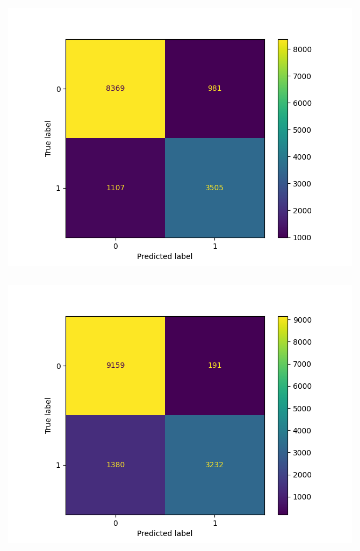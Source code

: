 \begin{figure}
        \vspace{-0.6cm}
        \hspace{-2cm}
        \begin{subfigure}[b]{0.245\textwidth}  
            \centering 
            \includegraphics[scale=0.35]{"../figs/fig_content_title/fig_ngram_2_DecisionTreeClassifier()__content_title.png"}
            \caption{}
        \end{subfigure}
        \begin{subfigure}[b]{0.245\textwidth}
            \centering
            \includegraphics[scale=0.35]{"../figs/fig_content_title/fig_ngram_3_DecisionTreeClassifier()__content_title.png"}
            \caption{}
        \end{subfigure}

\end{figure}
